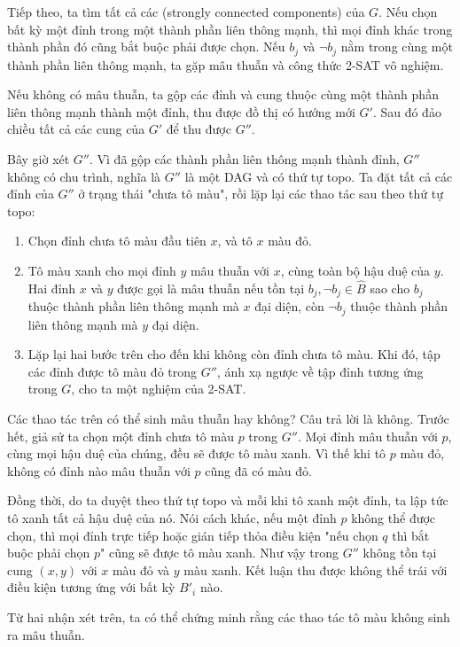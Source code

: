 \documentclass[11pt]{article}
\begin{document}
Tiếp theo, ta tìm tất cả các  (strongly
connected components) của $G$. Nếu chọn bất kỳ một đỉnh trong một thành phần
liên thông mạnh, thì mọi đỉnh khác trong thành phần đó cũng bắt buộc phải
được chọn. Nếu $b_j$ và $\neg b_j$ nằm trong cùng một thành phần liên thông
mạnh, ta gặp mâu thuẫn và công thức 2-SAT vô nghiệm.

Nếu không có mâu thuẫn, ta gộp các đỉnh và cung thuộc cùng một thành phần liên
thông mạnh thành một đỉnh, thu được đồ thị có hướng mới $G'$. Sau đó đảo
chiều tất cả các cung của $G'$ để thu được $G''$.

Bây giờ xét $G''$. Vì đã gộp các thành phần liên thông mạnh thành đỉnh, $G''$
không có chu trình, nghĩa là $G''$ là một DAG và có thứ tự topo. Ta đặt tất cả
các đỉnh của $G''$ ở trạng thái "chưa tô màu", rồi lặp lại các thao tác sau
theo thứ tự topo:

\begin{enumerate}
  \item Chọn đỉnh chưa tô màu đầu tiên $x$, và tô $x$ màu đỏ.
  \item Tô màu xanh cho mọi đỉnh $y$ mâu thuẫn với $x$, cùng toàn bộ hậu duệ
  của $y$. Hai đỉnh $x$ và $y$ được gọi là mâu thuẫn nếu tồn tại
  $b_j,\neg b_j\in \hat B$ sao cho $b_j$ thuộc thành phần liên thông mạnh mà
  $x$ đại diện, còn $\neg b_j$ thuộc thành phần liên thông mạnh mà $y$ đại
  diện.
  \item Lặp lại hai bước trên cho đến khi không còn đỉnh chưa tô màu. Khi đó,
  tập các đỉnh được tô màu đỏ trong $G''$, ánh xạ ngược về tập đỉnh tương ứng
  trong $G$, cho ta một nghiệm của 2-SAT.
\end{enumerate}

Các thao tác trên có thể sinh mâu thuẫn hay không? Câu trả lời là không.
Trước hết, giả sử ta chọn một đỉnh chưa tô màu $p$ trong $G''$. Mọi đỉnh mâu
thuẫn với $p$, cùng mọi hậu duệ của chúng, đều sẽ được tô màu xanh. Vì thế khi
tô $p$ màu đỏ, không có đỉnh nào mâu thuẫn với $p$ cũng đã có màu đỏ.

Đồng thời, do ta duyệt theo thứ tự topo và mỗi khi tô xanh một đỉnh, ta lập
tức tô xanh tất cả hậu duệ của nó. Nói cách khác, nếu một đỉnh $p$ không thể
được chọn, thì mọi đỉnh trực tiếp hoặc gián tiếp thỏa điều kiện "nếu chọn $q$
thì bắt buộc phải chọn $p$" cũng sẽ được tô màu xanh. Như vậy trong $G''$
không tồn tại cung $(x,y)$ với $x$ màu đỏ và $y$ màu xanh. Kết luận thu được
không thể trái với điều kiện tương ứng với bất kỳ $B'_i$ nào.

Từ hai nhận xét trên, ta có thể chứng minh rằng các thao tác tô màu không sinh
ra mâu thuẫn.
\end{document}
